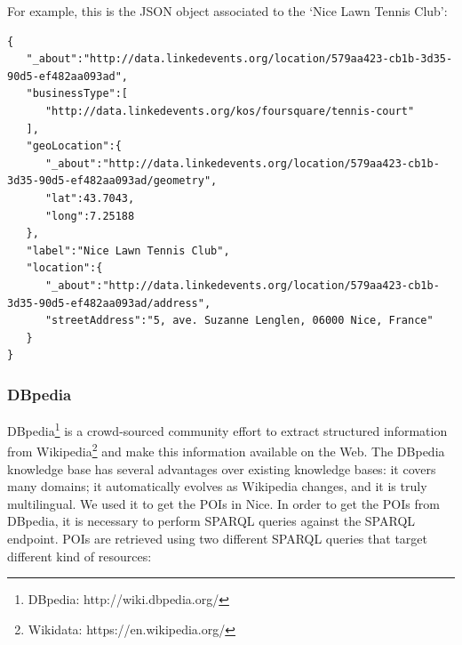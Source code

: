 \documentclass[paper=a4, fontsize=11pt]{scrartcl}
\begin{document}
For example, this is the JSON object associated to the `Nice Lawn Tennis Club': \begin{lstlisting}
{  
   "_about":"http://data.linkedevents.org/location/579aa423-cb1b-3d35-90d5-ef482aa093ad",
   "businessType":[  
      "http://data.linkedevents.org/kos/foursquare/tennis-court"
   ],
   "geoLocation":{  
      "_about":"http://data.linkedevents.org/location/579aa423-cb1b-3d35-90d5-ef482aa093ad/geometry",
      "lat":43.7043,
      "long":7.25188
   },
   "label":"Nice Lawn Tennis Club",
   "location":{  
      "_about":"http://data.linkedevents.org/location/579aa423-cb1b-3d35-90d5-ef482aa093ad/address",
      "streetAddress":"5, ave. Suzanne Lenglen, 06000 Nice, France"
   }
}

\end{lstlisting}
\subsubsection{DBpedia}
DBpedia\footnote{DBpedia: http://wiki.dbpedia.org/} is a crowd-sourced community effort to extract structured information from Wikipedia\footnote{Wikidata: https://en.wikipedia.org/} and make this information available on the Web. The DBpedia knowledge base has several advantages over existing knowledge bases: it covers many domains; it automatically evolves as Wikipedia changes, and it is truly multilingual. 
We used it to get the POIs in Nice.
In order to get the POIs from DBpedia, it is necessary to perform SPARQL queries against the SPARQL endpoint. POIs are retrieved using two different SPARQL queries that target different kind of resources:
\end{document}
